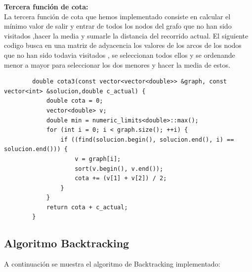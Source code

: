 \documentclass[11pt,openany]{book}
\begin{document}
    \textbf{Tercera función de cota:} \\
    La tercera función de cota que hemos implementado consiste en calcular el mínimo valor de salir y entrar  de todos los nodos del grafo que no 
    han sido visitados ,hacer la media  y sumarle la distancia del recorrido actual.
    El siguiente codigo busca en una matriz de adyacencia los valores de los arcos de los nodos que no han sido todavia visitados , se 
    seleccionan todos ellos y se ordenande menor a mayor para seleccionar los dos menores y hacer la media de estos.
    \begin{lstlisting}
        double cota3(const vector<vector<double>> &graph, const vector<int> &solucion,double c_actual) {
            double cota = 0;
            vector<double> v;
            double min = numeric_limits<double>::max();
            for (int i = 0; i < graph.size(); ++i) {
                if ((find(solucion.begin(), solucion.end(), i) == solucion.end())) {
                    v = graph[i];
                    sort(v.begin(), v.end());
                    cota += (v[1] + v[2]) / 2;
                }
            }
            return cota + c_actual;
        }
    \end{lstlisting}
\subsection{Algoritmo Backtracking}
A continuación se muestra el algoritmo de Backtracking implementado:
\end{document}
